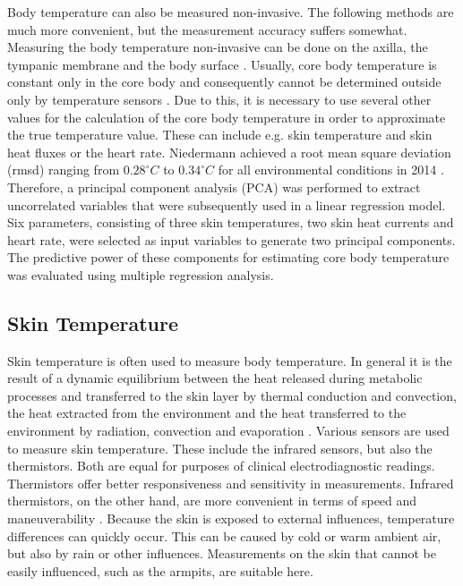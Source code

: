 Body temperature can also be measured non-invasive.
The following methods are much more convenient, but the measurement accuracy suffers somewhat.
Measuring the body temperature non-invasive can be done on the axilla, the tympanic membrane and the body surface \cite{moranCoreTemperatureMeasurement2002a}.
Usually, core body temperature is constant only in the core body and consequently cannot be determined outside only by temperature sensors \cite{niedermannPredictionHumanCore2014}.
Due to this, it is necessary to use several other values for the calculation of the core body temperature in order to approximate the true temperature value. 
These can include e.g. skin temperature and skin heat fluxes or the heart rate.
Niedermann achieved a root mean square deviation (rmsd) ranging from $0.28 ^\circ C$ to $0.34 ^\circ C$ for all environmental conditions in 2014 \cite{niedermannPredictionHumanCore2014}.
Therefore, a principal component analysis (PCA) was performed to extract uncorrelated variables that were subsequently used in a linear regression model. 
Six parameters, consisting of three skin temperatures, two skin heat currents and heart rate, were selected as input variables to generate two principal components. 
The predictive power of these components for estimating core body temperature was evaluated using multiple regression analysis.

\subsection{Skin Temperature}
\label{Background:BodyTemperature:SkinTemperature}
Skin temperature is often used to measure body temperature.
In general it is the result of a dynamic equilibrium between the heat released during metabolic processes and transferred to the skin layer by thermal conduction and convection, the heat extracted from the environment and the heat transferred to the environment by radiation, convection and evaporation \cite{dolibogComparativeAnalysisHuman2022}.
Various sensors are used to measure skin temperature. 
These include the infrared sensors, but also the thermistors. 
Both are equal for purposes of clinical electrodiagnostic readings.
Thermistors offer better responsiveness and sensitivity in measurements.
Infrared thermistors, on the other hand, are more convenient in terms of speed and maneuverability \cite{burnhamThreeTypesSkinSurface2006}.
Because the skin is exposed to external influences, temperature differences can quickly occur.
This can be caused by cold or warm ambient air, but also by rain or other influences.
Measurements on the skin that cannot be easily influenced, such as the armpits, are suitable here.

